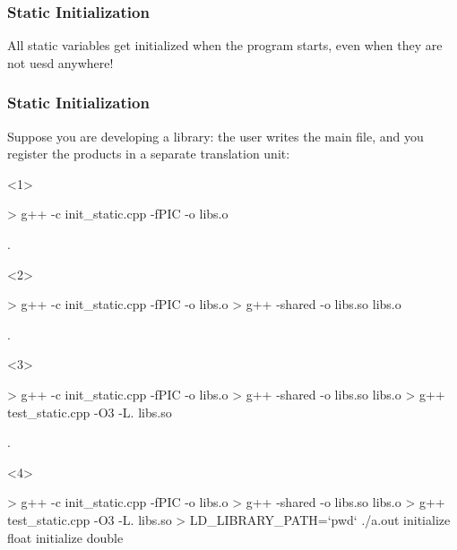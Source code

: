\documentclass[aspectratio=43]{beamer}
\begin{document}
\begin{frame}[fragile]\frametitle{Static Initialization}
  All static variables get initialized when the program starts, even when they are not uesd anywhere!
\end{frame}

\begin{frame}[fragile]\frametitle{Static Initialization}
  Suppose you are developing a library: the user writes the main file, and you register the products in a separate translation unit:

  \begin{onlyenv}<1>
\begin{Shelllisting}{}
> g++ -c init_static.cpp -fPIC -o libs.o




.
\end{Shelllisting}
  \end{onlyenv}
  \begin{onlyenv}<2>
\begin{Shelllisting}{}
> g++ -c init_static.cpp -fPIC -o libs.o
> g++ -shared -o libs.so libs.o



.
\end{Shelllisting}
  \end{onlyenv}
  \begin{onlyenv}<3>
\begin{Shelllisting}{}
> g++ -c init_static.cpp -fPIC -o libs.o
> g++ -shared -o libs.so libs.o
> g++ test_static.cpp -O3 -L. libs.so


.
\end{Shelllisting}
  \end{onlyenv}
  \begin{onlyenv}<4>
\begin{Shelllisting}{}
> g++ -c init_static.cpp -fPIC -o libs.o
> g++ -shared -o libs.so libs.o
> g++ test_static.cpp -O3 -L. libs.so
> LD_LIBRARY_PATH=`pwd` ./a.out
initialize float
initialize double
\end{Shelllisting}
  \end{onlyenv}
\end{frame}
\end{document}
